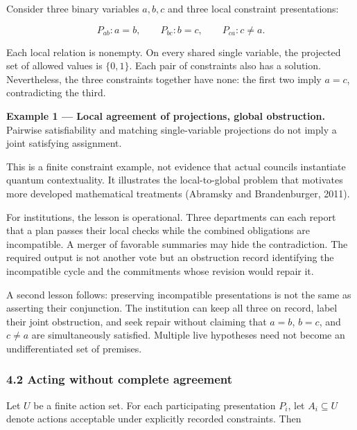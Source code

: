 \documentclass[
  10pt,
]{article}
\begin{document}
Consider three binary variables \protect\hypertarget{math-E0041-0052}{}{\(a,b,c\)} and three local constraint presentations:

\protect\hypertarget{math-E0042-0053}{}{\[
P_{ab}:a=b,\qquad P_{bc}:b=c,\qquad P_{ca}:c\ne a.
\]}

Each local relation is nonempty. On every shared single variable, the projected set of allowed values is \protect\hypertarget{math-E0043-0054}{}{\(\{0,1\}\)}. Each pair of constraints also has a solution. Nevertheless, the three constraints together have none: the first two imply \protect\hypertarget{math-E0044-0055}{}{\(a=c\)}, contradicting the third.

\textbf{Example 1 --- Local agreement of projections, global obstruction.} Pairwise satisfiability and matching single-variable projections do not imply a joint satisfying assignment.

This is a finite constraint example, not evidence that actual councils instantiate quantum contextuality. It illustrates the local-to-global problem that motivates more developed mathematical treatments (Abramsky and Brandenburger, 2011).

For institutions, the lesson is operational. Three departments can each report that a plan passes their local checks while the combined obligations are incompatible. A merger of favorable summaries may hide the contradiction. The required output is not another vote but an obstruction record identifying the incompatible cycle and the commitments whose revision would repair it.

A second lesson follows: preserving incompatible presentations is not the same as asserting their conjunction. The institution can keep all three on record, label their joint obstruction, and seek repair without claiming that \protect\hypertarget{math-E0045-0056}{}{\(a=b\)}, \protect\hypertarget{math-E0046-0057}{}{\(b=c\)}, and \protect\hypertarget{math-E0047-0058}{}{\(c\ne a\)} are simultaneously satisfied. Multiple live hypotheses need not become an undifferentiated set of premises.

\subsubsection{4.2 Acting without complete agreement}\label{acting-without-complete-agreement}

Let \protect\hypertarget{math-E0048-0059}{}{\(U\)} be a finite action set. For each participating presentation \protect\hypertarget{math-E0049-0060}{}{\(P_i\)}, let \protect\hypertarget{math-E0050-0061}{}{\(A_i\subseteq U\)} denote actions acceptable under explicitly recorded constraints. Then
\end{document}
